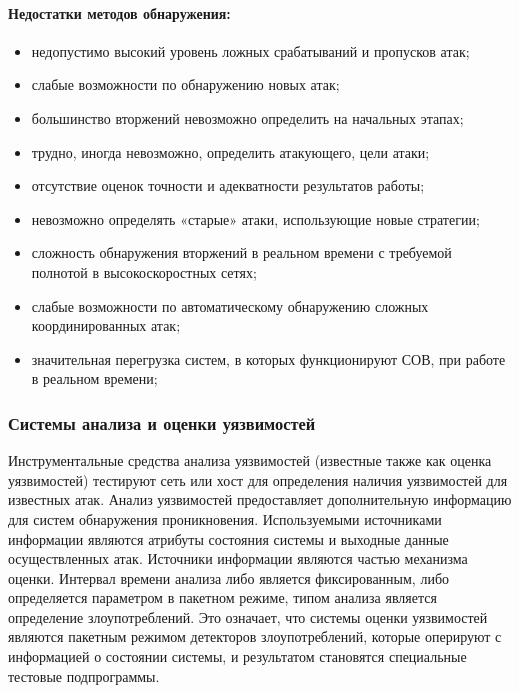 \paragraph*{Недостатки методов обнаружения:}

\begin{itemize}
	\item недопустимо высокий уровень ложных срабатываний и пропусков атак;
	\item слабые возможности по обнаружению новых атак;
	\item большинство вторжений невозможно определить на начальных этапах;
	\item трудно, иногда невозможно, определить атакующего, цели атаки;
	\item отсутствие оценок точности и адекватности результатов работы;
	\item невозможно определять «старые» атаки, использующие новые стратегии;
	\item сложность обнаружения вторжений в реальном времени с требуемой полнотой в высокоскоростных сетях;
	\item слабые возможности по автоматическому обнаружению сложных координированных атак;
	\item значительная перегрузка систем, в которых функционируют СОВ, при работе в реальном времени;
	
\end{itemize}



\subsubsection{Системы анализа и оценки уязвимостей}


Инструментальные средства анализа уязвимостей (известные также как оценка уязвимостей) тестируют сеть или хост для определения наличия уязвимостей для известных атак. Анализ уязвимостей предоставляет дополнительную информацию для систем обнаружения проникновения. Используемыми источниками информации являются атрибуты состояния системы и выходные данные осуществленных атак. Источники информации являются частью механизма оценки. Интервал времени анализа либо является фиксированным, либо определяется параметром в пакетном режиме, типом анализа является определение злоупотреблений. Это означает, что системы оценки уязвимостей являются пакетным режимом детекторов злоупотреблений, которые оперируют с информацией о состоянии системы, и результатом становятся специальные тестовые подпрограммы. \autocite{IntrusionDetectionSystemsMsu}

